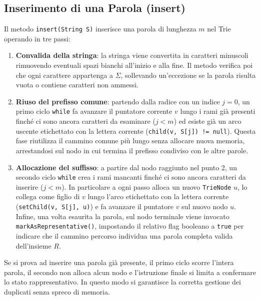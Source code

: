 \documentclass[11pt,a4paper]{article}
\begin{document}
\subsection{Inserimento di una Parola (insert)}
Il metodo \texttt{insert(String S)} inserisce una parola di lunghezza $m$ nel Trie operando in tre passi:
\begin{enumerate}
    \item \textbf{Convalida della stringa}: la stringa viene convertita in caratteri minuscoli rimuovendo eventuali spazi bianchi all'inizio e alla fine. Il metodo verifica poi che ogni carattere appartenga a $\Sigma$, sollevando un'eccezione se la parola risulta vuota o contiene caratteri non ammessi.
    \item \textbf{Riuso del prefisso comune}: partendo dalla radice con un indice $j = 0$, un primo ciclo \texttt{while} fa avanzare il puntatore corrente $v$ lungo i rami già presenti finché ci sono ancora caratteri da esaminare ($j < m$) ed esiste già un arco uscente etichettato con la lettera corrente (\texttt{child(v, S[j]) != null}). Questa fase riutilizza il cammino comune più lungo senza allocare nuova memoria, arrestandosi sul nodo in cui termina il prefisso condiviso con le altre parole.
    \item \textbf{Allocazione del suffisso}: a partire dal nodo raggiunto nel punto 2, un secondo ciclo \texttt{while} crea i rami mancanti finché ci sono ancora caratteri da inserire ($j < m$). In particolare a ogni passo alloca un nuovo \texttt{TrieNode} $u$, lo collega come figlio di $v$ lungo l'arco etichettato con la lettera corrente (\texttt{setChild(v, S[j], u)}) e fa avanzare il puntatore $v$ sul nuovo nodo $u$. Infine, una volta esaurita la parola, sul nodo terminale viene invocato \texttt{markAsRepresentative()}, impostando il relativo flag booleano a \texttt{true} per indicare che il cammino percorso individua una parola completa valida dell'insieme $R$.
\end{enumerate}
Se si prova ad inserire una parola già presente, il primo ciclo scorre l'intera parola, il secondo non alloca alcun nodo e l'istruzione finale si limita a confermare lo stato rappresentativo. In questo modo si garantisce la corretta gestione dei duplicati senza spreco di memoria.
\end{document}
